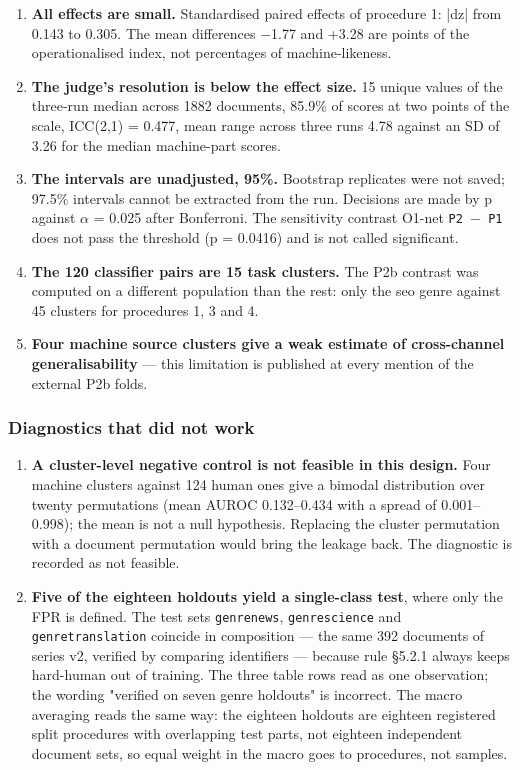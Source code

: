 \documentclass[11pt,a4paper]{article}
\renewcommand{\_}{\textunderscore\allowbreak}
\begin{document}
\begin{enumerate}
\item[7.] \textbf{All effects are small.} Standardised paired effects of procedure 1: |d\_z| from 0.143 to 0.305. The mean differences $-$1.77 and +3.28 are points of the operationalised index, not percentages of machine-likeness.
\item[8.] \textbf{The judge's resolution is below the effect size.} 15 unique values of the three-run median across 1882 documents, 85.9\% of scores at two points of the scale, ICC(2,1) = 0.477, mean range across three runs 4.78 against an SD of 3.26 for the median machine-part scores.
\item[9.] \textbf{The intervals are unadjusted, 95\%.} Bootstrap replicates were not saved; 97.5\% intervals cannot be extracted from the run. Decisions are made by p against $\alpha$ = 0.025 after Bonferroni. The sensitivity contrast O1-net \texttt{P2 $-$ P1} does not pass the threshold (p = 0.0416) and is not called significant.
\item[10.] \textbf{The 120 classifier pairs are 15 task clusters.} The P2b contrast was computed on a different population than the rest: only the seo genre against 45 clusters for procedures 1, 3 and 4.
\item[11.] \textbf{Four machine source clusters give a weak estimate of cross-channel generalisability} — this limitation is published at every mention of the external P2b folds.
\end{enumerate}

\subsubsection{Diagnostics that did not work}

\begin{enumerate}
\item[12.] \textbf{A cluster-level negative control is not feasible in this design.} Four machine clusters against 124 human ones give a bimodal distribution over twenty permutations (mean AUROC 0.132–0.434 with a spread of 0.001–0.998); the mean is not a null hypothesis. Replacing the cluster permutation with a document permutation would bring the leakage back. The diagnostic is recorded as not feasible.
\item[13.] \textbf{Five of the eighteen holdouts yield a single-class test}, where only the FPR is defined. The test sets \texttt{genre\_news}, \texttt{genre\_science} and \texttt{genre\_translation} coincide in composition — the same 392 documents of series v2, verified by comparing identifiers — because rule §5.2.1 always keeps hard-human out of training. The three table rows read as one observation; the wording "verified on seven genre holdouts" is incorrect. The macro averaging reads the same way: the eighteen holdouts are eighteen registered split procedures with overlapping test parts, not eighteen independent document sets, so equal weight in the macro goes to procedures, not samples.
\end{enumerate}
\end{document}
